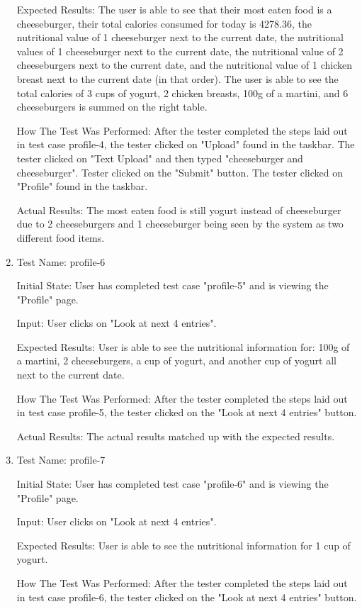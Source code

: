 \documentclass[12pt, titlepage]{article}
\begin{document}
\begin{enumerate}
		Expected Results: The user is able to see that their most eaten food is a cheeseburger, their total calories consumed for today is 4278.36, the nutritional value of 1 cheeseburger next to the current date, the nutritional values of 1 cheeseburger next to the current date, the nutritional value of 2 cheeseburgers next to the current date, and the nutritional value of 1 chicken breast next to the current date (in that order). The user is able to see the total calories of 3 cups of yogurt, 2 chicken breasts, 100g of a martini, and 6 cheeseburgers is summed on the right table.
		
		How The Test Was Performed: After the tester completed the steps laid out in test case profile-4, the tester clicked on "Upload" found in the taskbar. The tester clicked on "Text Upload" and then typed "cheeseburger and cheeseburger". Tester clicked on the "Submit" button. The tester clicked on "Profile" found in the taskbar.
		
		Actual Results: The most eaten food is still yogurt instead of cheeseburger due to 2 cheeseburgers and 1 cheeseburger being seen by the system as two different food items.
		
		\item{Test Name: profile-6}
		
		Initial State: User has completed test case "profile-5" and is viewing the "Profile" page.
		
		Input: User clicks on "Look at next 4 entries".
		
		Expected Results: User is able to see the nutritional information for: 100g of a martini, 2 cheeseburgers, a cup of yogurt, and another cup of yogurt all next to the current date.
		
		How The Test Was Performed: After the tester completed the steps laid out in test case profile-5, the tester clicked on the "Look at next 4 entries" button.
		
		Actual Results: The actual results matched up with the expected results.
		
		\item{Test Name: profile-7}
		
		Initial State: User has completed test case "profile-6" and is viewing the "Profile" page.
		
		Input: User clicks on "Look at next 4 entries".
		
		Expected Results: User is able to see the nutritional information for 1 cup of yogurt.
		
		How The Test Was Performed: After the tester completed the steps laid out in test case profile-6, the tester clicked on the "Look at next 4 entries" button.
		

\end{enumerate}
\end{document}
